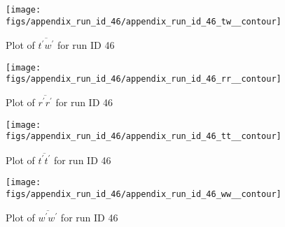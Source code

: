 \begin{figure}[H]
\centering
\texttt{[image: figs/appendix\_run\_id\_46/appendix\_run\_id\_46\_tw\_\_contour]}
\caption{Plot of $\overline{t^\prime w^\prime}$ for run ID 46}
\label{fig:appendix_run_id_46_tw__contour}
\end{figure}


\begin{figure}[H]
\centering
\texttt{[image: figs/appendix\_run\_id\_46/appendix\_run\_id\_46\_rr\_\_contour]}
\caption{Plot of $\overline{r^\prime r^\prime}$ for run ID 46}
\label{fig:appendix_run_id_46_rr__contour}
\end{figure}


\begin{figure}[H]
\centering
\texttt{[image: figs/appendix\_run\_id\_46/appendix\_run\_id\_46\_tt\_\_contour]}
\caption{Plot of $\overline{t^\prime t^\prime}$ for run ID 46}
\label{fig:appendix_run_id_46_tt__contour}
\end{figure}


\begin{figure}[H]
\centering
\texttt{[image: figs/appendix\_run\_id\_46/appendix\_run\_id\_46\_ww\_\_contour]}
\caption{Plot of $\overline{w^\prime w^\prime}$ for run ID 46}
\label{fig:appendix_run_id_46_ww__contour}
\end{figure}


